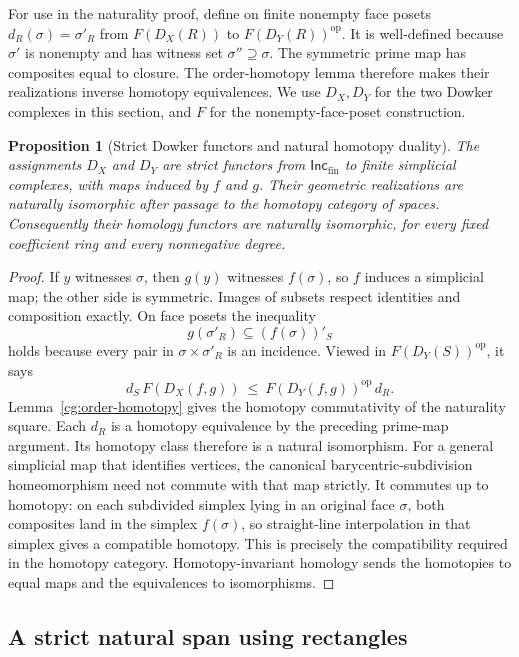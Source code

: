 \documentclass[11pt]{article}
\newtheorem{proposition}[theorem]{Proposition}
\theoremstyle{remark}
\begin{document}
For use in the naturality proof, define on finite nonempty face posets
$d_R(\sigma)=\sigma'_R$ from $F(D_X(R))$ to
$F(D_Y(R))^{\mathrm{op}}$. It is well-defined because $\sigma'$ is
nonempty and has witness set $\sigma''\supseteq\sigma$. The symmetric
prime map has composites equal to closure. The order-homotopy lemma
therefore makes their realizations inverse homotopy equivalences. We use
$D_X,D_Y$ for the two Dowker complexes in this section, and $F$ for the
nonempty-face-poset construction.
\begin{proposition}[Strict Dowker functors and natural homotopy duality]
\label{cg:covariant-natural}
The assignments $D_X$ and $D_Y$ are strict functors from
$\mathsf{Inc}_{\mathrm{fin}}$ to finite simplicial complexes, with maps
induced by $f$ and $g$. Their geometric realizations are naturally
isomorphic after passage to the homotopy category of spaces.
Consequently their homology functors are naturally isomorphic, for every
fixed coefficient ring and every nonnegative degree.
\end{proposition}
\begin{proof}
If $y$ witnesses $\sigma$, then $g(y)$ witnesses $f(\sigma)$, so $f$
induces a simplicial map; the other side is symmetric. Images of subsets
respect identities and composition exactly.
On face posets the inequality
\[
 g(\sigma'_R)\subseteq(f(\sigma))'_S
\]
holds because every pair in $\sigma\times\sigma'_R$ is an incidence.
Viewed in $F(D_Y(S))^{\mathrm{op}}$, it says
\[
 d_S\,F(D_X(f,g))\ \leq\ F(D_Y(f,g))^{\mathrm{op}}\,d_R.
\]
Lemma~\ref{cg:order-homotopy} gives the homotopy commutativity of the
naturality square. Each $d_R$ is a homotopy equivalence by the preceding prime-map argument. Its homotopy class therefore
is a natural isomorphism. For a general simplicial map that identifies vertices, the canonical
barycentric-subdivision homeomorphism need not commute with that map
strictly. It commutes up to homotopy: on each subdivided simplex lying in
an original face $\sigma$, both composites land in the simplex $f(\sigma)$,
so straight-line interpolation in that simplex gives a compatible homotopy.
This is precisely the compatibility required in the homotopy category.
Homotopy-invariant homology sends the homotopies to equal maps and the
equivalences to isomorphisms.
\end{proof}

\subsection{A strict natural span using rectangles}
\end{document}
